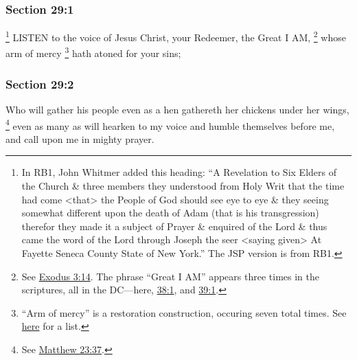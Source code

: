 	\subsubsection{Section 29:1} %
		\label{DC29-1}

			\footnote{%
				In RB1, John Whitmer added this heading: ``A Revelation to Six Elders of the Church \& three members they understood from Holy Writ that the time had come <that> the People of God should see eye to eye \& they seeing somewhat different upon the death of Adam (that is his transgression) therefor they made it a subject of Prayer \& enquired of the Lord \& thus came the word of the Lord through Joseph the seer <saying given> At Fayette Seneca County State of New York.'' The JSP version is from RB1.
				}%
		LISTEN to the voice of Jesus Christ, your Redeemer, the Great I AM,%
			\footnote{%
				See \hyperref[EXODUS-3-14]{Exodus 3:14}. The phrase ``Great I AM'' appears three times in the scriptures, all in the DC---here, \hyperref[DC38-1]{38:1}, and \hyperref[DC39-1]{39:1}.
				}
		whose arm of mercy%
			\footnote{%
				``Arm of mercy'' is a restoration construction, occuring seven total times. See \hyperref[MERCY-PHRASES]{here} for a list.
				}
		hath atoned for your sins;


	\subsubsection{Section 29:2} %
		\label{DC29-2}

		Who will gather his people even as a hen gathereth her chickens under her wings,%
			\footnote{%
				See \hyperref[MATTHEW-23-37]{Matthew 23:37}.
				}
		even as many as will hearken to my voice and humble themselves before me, and call upon me in mighty prayer.


